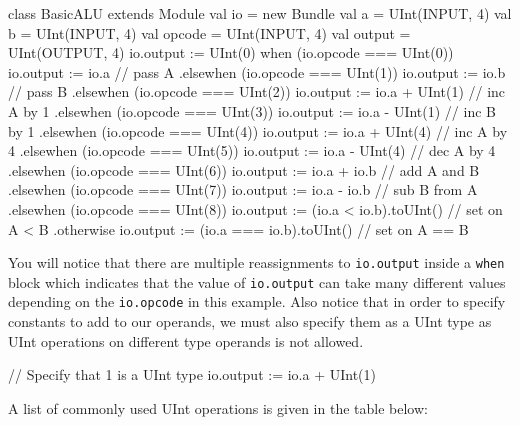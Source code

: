 \documentclass[twocolumn, 10pt]{article}
\begin{document}
\begin{scala}
class BasicALU extends Module {
  val io = new Bundle {
    val a      = UInt(INPUT, 4)
    val b      = UInt(INPUT, 4)
    val opcode = UInt(INPUT, 4)
    val output = UInt(OUTPUT, 4)
  }
  io.output := UInt(0) 
  when (io.opcode === UInt(0)) {
    io.output := io.a                     // pass A
  } .elsewhen (io.opcode === UInt(1)) {
    io.output := io.b                     // pass B
  } .elsewhen (io.opcode === UInt(2)) {
    io.output := io.a + UInt(1)           // inc A by 1
  } .elsewhen (io.opcode === UInt(3)) {
    io.output := io.a - UInt(1)           // inc B by 1
  } .elsewhen (io.opcode === UInt(4)) {
    io.output := io.a + UInt(4)           // inc A by 4
  } .elsewhen (io.opcode === UInt(5)) {
    io.output := io.a - UInt(4)           // dec A by 4
  } .elsewhen (io.opcode === UInt(6)) {
    io.output := io.a + io.b              // add A and B
  } .elsewhen (io.opcode === UInt(7)) {
    io.output := io.a - io.b              // sub B from A
  } .elsewhen (io.opcode === UInt(8)) {
    io.output := (io.a < io.b).toUInt()   // set on A < B
  } .otherwise { 
    io.output := (io.a === io.b).toUInt() // set on A == B
  }
}
\end{scala}

You will notice that there are multiple reassignments to \verb+io.output+ inside a \verb+when+ block which indicates that the value of \verb+io.output+ can take many different values depending on the \verb+io.opcode+ in this example. Also notice that in order to specify constants to add to our operands, we must also specify them as a UInt type as UInt operations on different type operands is not allowed.

\begin{scala}
// Specify that 1 is a UInt type
io.output := io.a + UInt(1) 
\end{scala}

A list of commonly used UInt operations is given in the table below:
\end{document}
